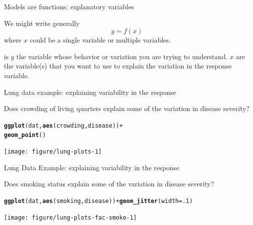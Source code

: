 \documentclass[table]{beamer}\usepackage[]{graphicx}\usepackage[]{color}
\makeatletter
\newcommand{\hlnum}[1]{\textcolor[rgb]{0.686,0.059,0.569}{#1}}%
\newcommand{\hlopt}[1]{\textcolor[rgb]{0,0,0}{#1}}%
\newcommand{\hlstd}[1]{\textcolor[rgb]{0.345,0.345,0.345}{#1}}%
\newcommand{\hlkwc}[1]{\textcolor[rgb]{0.333,0.667,0.333}{#1}}%
\newcommand{\hlkwd}[1]{\textcolor[rgb]{0.737,0.353,0.396}{\textbf{#1}}}%
\newenvironment{kframe}{%
 \def\at@end@of@kframe{}%
 \ifinner\ifhmode%
  \def\at@end@of@kframe{\end{minipage}}%
  \begin{minipage}{\columnwidth}%
 \fi\fi%
 \def\FrameCommand##1{\hskip\@totalleftmargin \hskip-\fboxsep
 \colorbox{shadecolor}{##1}\hskip-\fboxsep
     \hskip-\linewidth \hskip-\@totalleftmargin \hskip\columnwidth}%
 \MakeFramed {\advance\hsize-\width
   \@totalleftmargin\z@ \linewidth\hsize
   \@setminipage}}%
 {\par\unskip\endMakeFramed%
 \at@end@of@kframe}
\newenvironment{knitrout}{}{} %
\makeatother
\begin{document}

\begin{frame}[fragile]{Models are functions: explanatory variables}

We might write generally $$ y = f(x)$$ where $x$ could be a single variable or multiple variables.

\bi
   is $y$ the variable whose behavior or variation you are trying to understand.
   $x$ are the variable(s) that you want to use to explain the variation in the response variable.
\ei

\end{frame}


\begin{frame}[fragile]{Lung data example: explaining variability in the response}

Does crowding of living quarters explain some of the variation in disease severity?


\begin{knitrout}\footnotesize
{}\color{fgcolor}\begin{kframe}
\begin{alltt}
\hlkwd{ggplot}\hlstd{(dat,} \hlkwd{aes}\hlstd{(crowding, disease))} \hlopt{+}
  \hlkwd{geom_point}\hlstd{()}
\end{alltt}
\end{kframe}
\texttt{[image: figure/lung-plots-1]} 
\end{knitrout}


\end{frame}


\begin{frame}[fragile]{Lung Data Example: explaining variability in the response}

Does smoking status explain some of the variation in disease severity?

\begin{knitrout}\footnotesize
{}\color{fgcolor}\begin{kframe}
\begin{alltt}
\hlkwd{ggplot}\hlstd{(dat,} \hlkwd{aes}\hlstd{(smoking, disease))} \hlopt{+} \hlkwd{geom_jitter}\hlstd{(}\hlkwc{width}\hlstd{=}\hlnum{.1}\hlstd{)}
\end{alltt}
\end{kframe}
\texttt{[image: figure/lung-plots-fac-smoke-1]} 
\end{knitrout}


\end{frame}
\end{document}
